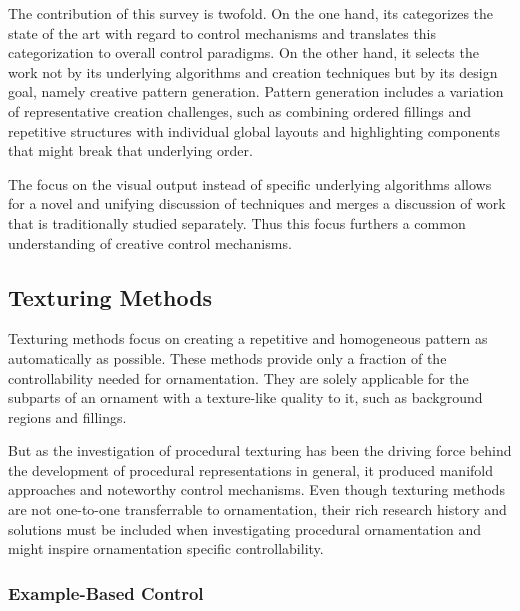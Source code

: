 The contribution of this survey is twofold. On the one hand, its categorizes the state of the art with regard to control mechanisms and translates this categorization to overall control paradigms.
On the other hand, it selects the work not by its underlying algorithms and creation techniques but by its design goal, namely creative pattern generation. Pattern generation includes a variation of representative creation challenges, such as combining ordered fillings and repetitive structures with individual global layouts and highlighting components that might break that underlying order. 

The focus on the visual output instead of specific underlying algorithms allows for a novel and unifying discussion of techniques and merges a discussion of work that is traditionally studied separately. Thus this focus furthers a common understanding of creative control mechanisms.




\subsection{Texturing Methods}
\label{subsec:analysis_texturing_methods}

Texturing methods focus on creating a repetitive and homogeneous pattern as automatically as possible. These methods provide only a fraction of the controllability needed for ornamentation. They are solely applicable for the subparts of an ornament with a texture-like quality to it, such as background regions and fillings.

But as the investigation of procedural texturing has been the driving force behind the development of procedural representations in general, it produced manifold approaches and noteworthy control mechanisms. Even though texturing methods are not one-to-one transferrable to ornamentation, their rich research history and solutions must be included when investigating procedural ornamentation and might inspire ornamentation specific controllability.


\subsubsection{Example-Based Control}


